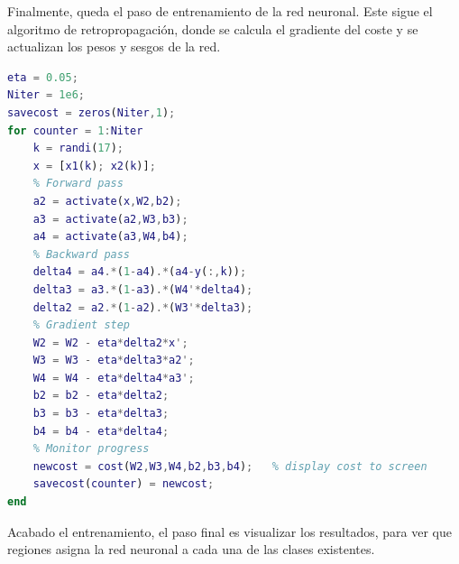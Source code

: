 \documentclass[a4paper,11pt,spanish, twoside, leqno]{tfg-uam}
\theoremstyle{definition}
\begin{document}
Finalmente, queda el paso de entrenamiento de la red neuronal. Este sigue el algoritmo de retropropagación, donde se calcula el gradiente del coste y se actualizan los pesos y sesgos de la red. 

\begin{lstlisting}[language=Matlab]
eta = 0.05;
Niter = 1e6;
savecost = zeros(Niter,1);
for counter = 1:Niter
    k = randi(17);
    x = [x1(k); x2(k)];
    % Forward pass
    a2 = activate(x,W2,b2);
    a3 = activate(a2,W3,b3);
    a4 = activate(a3,W4,b4);
    % Backward pass
    delta4 = a4.*(1-a4).*(a4-y(:,k));
    delta3 = a3.*(1-a3).*(W4'*delta4);
    delta2 = a2.*(1-a2).*(W3'*delta3);
    % Gradient step
    W2 = W2 - eta*delta2*x';
    W3 = W3 - eta*delta3*a2';
    W4 = W4 - eta*delta4*a3';
    b2 = b2 - eta*delta2;
    b3 = b3 - eta*delta3;
    b4 = b4 - eta*delta4;
    % Monitor progress
    newcost = cost(W2,W3,W4,b2,b3,b4);   % display cost to screen
    savecost(counter) = newcost;
end

\end{lstlisting}

Acabado el entrenamiento, el paso final es visualizar los resultados, para ver que regiones asigna la red neuronal a cada una de las clases existentes.
\end{document}
